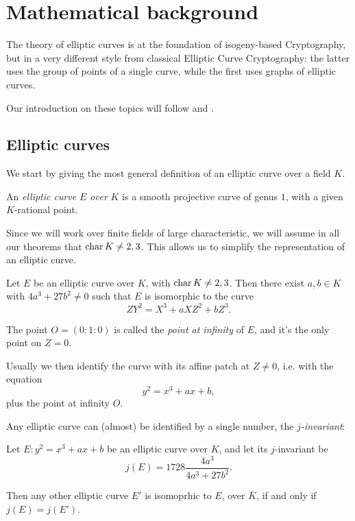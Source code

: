 \chapter{Mathematical background}

The theory of elliptic curves is at the foundation of isogeny-based Cryptography, but in a very different style from classical Elliptic Curve Cryptography: the latter uses the group of points of a single curve, while the first uses graphs of elliptic curves.

Our introduction on these topics will follow \cite{Silverman} and \cite{DeFeo_intro}.

\section{Elliptic curves}

We start by giving the most general definition of an elliptic curve over a field $K$.

\begin{definition}
    An \emph{elliptic curve} $E$ \emph{over} $K$ is a smooth projective curve of genus $1$, with a given $K$-rational point.
\end{definition}

Since we will work over finite fields of large characteristic, we will assume in all our theorems that $\operatorname{char} K\neq 2,3$. This allows us to simplify the representation of an elliptic curve.

\begin{proposition}
    Let $E$ be an elliptic curve over $K$, with $\operatorname{char} K\neq 2,3$. Then there exist $a,b\in K$ with $4a^3+27b^2\neq0$ such that $E$ is isomorphic to the curve $$ZY^2=X^3+aXZ^2+bZ^3.$$
    
    The point $O=(0:1:0)$ is called the \emph{point at infinity} of $E$, and it's the only point on $Z=0$.
\end{proposition}

Usually we then identify the curve with its affine patch at $Z\neq0$, i.e. with the equation $$y^2=x^3+ax+b,$$
plus the point at infinity $O$.

Any elliptic curve can (almost) be identified by a single number, the \emph{$j$-invariant}:
\begin{theorem}
    Let $E:y^2=x^3+ax+b$ be an elliptic curve over $K$, and let its $j$-invariant be $$j(E)=1728\frac{4a^3}{4a^3+27b^2}.$$
    
    Then any other elliptic curve $E'$ is isomoprhic to $E$, over $\bar K$, if and only if $j(E)=j(E')$.
\end{theorem}

